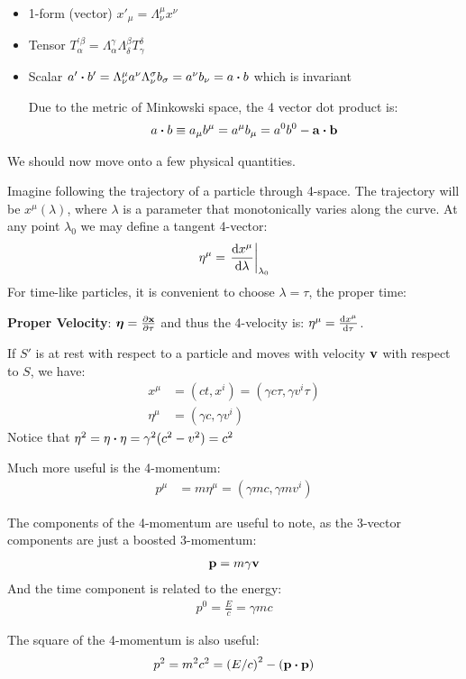 \begin{itemize}
\item 1-form (vector) $x'_\mu=\Lambda^\mu_\nu x^\nu$
\item Tensor $T^{\prime\beta}_\alpha = \Lambda_\alpha^\gamma \Lambda_\delta^\beta T_\gamma^\delta$
\item Scalar $a'\vdot b'=\Lambda^\mu_\nu a^\nu\Lambda_\nu^\sigma b_\sigma=a^\nu b_\nu=a\vdot b$ which is invariant
  \begin{note}
    Due to the metric of Minkowski space, the 4 vector dot product is:
    \begin{align*}
      a\vdot b\equiv a_\mu b^\mu=a^\mu b_\mu=a^0b^0-\vb{a\vdot b}
    \end{align*}
  \end{note}
\end{itemize}
We should now move onto a few physical quantities.

Imagine following the trajectory of a particle through 4-space. The trajectory will be $x^\mu(\lambda)$, where $\lambda$ is a parameter that monotonically varies along the curve. At any point $\lambda_0$ we may define a tangent 4-vector:
\begin{align*}
  \eta^\mu=\eval{\dv{x^\mu}{\lambda}}_{\lambda_0}
\end{align*}
For time-like particles, it is convenient to choose $\lambda=\tau$, the proper time:

\textbf{Proper Velocity}: $\bm{\eta}=\pdv{\vb{x}}{\tau}$ and thus the 4-velocity is: $\eta^\mu=\dv{x^\mu}{\tau}$.

If $S'$ is at rest with respect to a particle and moves with velocity $\vb{v}$ with respect to $S$, we have:
\begin{align*}
  x^\mu &= (ct,x^i) = (\gamma c\tau, \gamma v^i\tau)\\
  \eta^\mu &= (\gamma c, \gamma v^i)
\end{align*}
Notice that $\eta^2=\eta\vdot\eta=\gamma^2(c^2-v^2)=c^2$

Much more useful is the 4-momentum:
\begin{align*}
  p^\mu&=m\eta^\mu=(\gamma mc, \gamma mv^i)
\end{align*}
\begin{note}
  The components of the 4-momentum are useful to note, as the 3-vector components are just a boosted 3-momentum:
  \begin{align*}
    \vb{p}=m\gamma \vb{v}
  \end{align*}
  And the time component is related to the energy:
  \begin{align*}
    p^0=\frac{E}{c}=\gamma m c
  \end{align*}
\end{note}
The square of the 4-momentum is also useful:
\begin{align*}
  p^2=m^2c^2 = \qty(E/c)^2-(\vb{p\vdot p})
\end{align*}

